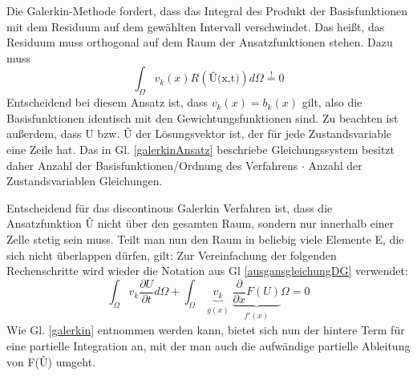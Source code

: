 Die Galerkin-Methode fordert, dass das Integral des Produkt der Basisfunktionen mit dem Residuum auf dem gewählten Intervall verschwindet. Das heißt, das Residuum muss orthogonal auf dem Raum der Ansatzfunktionen stehen. Dazu muss
\begin{equation}\label{galerkinAnsatz}
	\int_{\Omega} v_{k}(x) R(\text{\^{U}(x,t)}) d\Omega  \overset{!}{=} 0
\end{equation}
Entscheidend bei diesem Ansatz ist, dass $v_{k}(x)=b_{k}(x)$ gilt, also die Basisfunktionen identisch mit den Gewichtungsfunktionen sind. Zu beachten ist außerdem, dass U bzw. \^{U} der Lösungsvektor ist, der für jede Zustandsvariable eine Zeile hat. Das in Gl. \ref{galerkinAnsatz} beschriebe Gleichungssystem besitzt daher Anzahl der Basisfunktionen/Ordnung des Verfahrens $\cdot$ Anzahl der Zustandsvariablen Gleichungen.

Entscheidend für das discontinous Galerkin Verfahren ist, dass die Ansatzfunktion \^{U} nicht über den gesamten Raum, sondern nur innerhalb einer Zelle stetig sein muss. Teilt man nun den Raum in beliebig viele Elemente E, die sich nicht überlappen dürfen, gilt:
Zur Vereinfachung der folgenden Rechenschritte wird wieder die Notation aus Gl \ref{ausgansgleichungDG} verwendet:
\begin{equation}\label{galerkin}
	\int_{\Omega}v_{k}\frac{\partial U}{\partial t}d\Omega+ \int_{\Omega} \underbrace{v_{k}}_{\substack{g(x)}}\underbrace{\frac{\partial}{\partial x} F(U)}_{\substack{f'(x)}}{\Omega} = 0
\end{equation}
Wie Gl. \ref{galerkin} entnommen werden kann, bietet sich nun der hintere Term für eine partielle Integration an, mit der man auch die aufwändige partielle Ableitung von F(\^{U}) umgeht.
